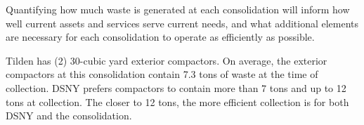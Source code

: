 
    Quantifying how much waste is generated at each consolidation will inform how well current assets and services serve current needs, and what additional elements are necessary for each consolidation to operate as efficiently as possible.
    
    Tilden has (2) 30-cubic yard exterior compactors. On average, the exterior compactors at this consolidation contain 7.3 tons of waste at the time of collection. DSNY prefers compactors to contain more than 7 tons and up to 12 tons at collection. The closer to 12 tons, the more efficient collection is for both DSNY and the consolidation.